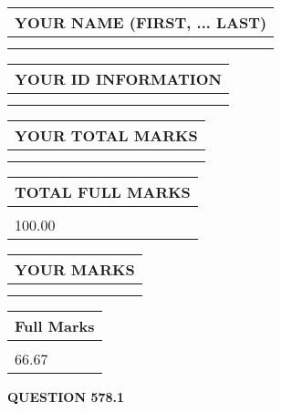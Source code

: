 \documentclass{ctexart}
\begin{document}
   
   
   
\newpage 
\setcounter{page}{ 
   578001 } 
   
   
   
   
\noindent\begin{tabular}{|l|}
\hline
YOUR NAME (FIRST, ... LAST)  \\
\hline
 \\ 
 \\ 
\hline
\end{tabular}
\hspace{0.05in} \begin{tabular}{|l|}
\hline
 YOUR   ID   INFORMATION  \\
\hline
 \\ 
 \\ 
\hline
\end{tabular}
   
   
\vspace{0.2in}\noindent\begin{tabular}{|l|}
\hline
YOUR TOTAL MARKS  \\
\hline
 \\ 
 \\ 
\hline
\end{tabular}
\hspace{0.05in} \begin{tabular}{|l|}
\hline
TOTAL FULL MARKS  \\
\hline
 \\ 
100.00 \\
\hline
\end{tabular}
   
   
 \vspace{0.2in}
 
 
 
 
   
   
  
\vspace{0.2in}
  
\noindent\begin{tabular}{|l|}
\hline
 YOUR MARKS  \\
\hline
 \\ 
 \\ 
\hline
\end{tabular}
\hspace{0.05in} \begin{tabular}{|l|}
\hline
 Full Marks  \\
\hline
 \\ 
66.67 \\
\hline
\end{tabular}
{\textbf{\Large{QUESTION
578.1 
}}}
  
\end{document}
